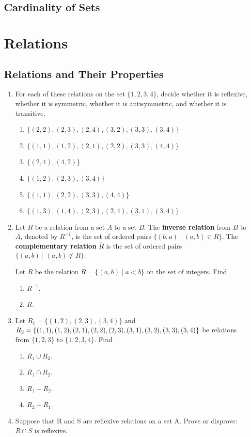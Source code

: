 \documentclass{sig-alternate-05-2015}
\begin{document}
\subsection{Cardinality of Sets}
\section{Relations}
\subsection{Relations and Their Properties}
\begin{enumerate}
\item For each of these relations on the set $\{1, 2, 3, 4\}$, decide
whether it is reflexive, whether it is symmetric, whether
it is antisymmetric, and whether it is transitive.
\begin{enumerate}
\item $\{(2, 2), (2, 3), (2, 4), (3, 2), (3, 3), (3, 4)\}$
\item $\{(1, 1), (1, 2), (2, 1), (2, 2), (3, 3), (4, 4)\}$
\item $\{(2, 4), (4, 2)\}$
\item $\{(1, 2), (2, 3), (3, 4)\}$
\item $\{(1, 1), (2, 2), (3, 3), (4, 4)\}$
\item $\{(1, 3), (1, 4), (2, 3), (2, 4), (3, 1), (3, 4)\}$
\end{enumerate}
\item 
Let $R$ be a relation from a set $A$ to a set $B$. The \textbf{inverse relation}
from $B$ to $A$, denoted by $R^{-1}$, is the set of ordered pairs
$\{(b, a) \mid (a, b) \in R\}$. The \textbf{complementary relation} $\overline{R}$ is the
set of ordered pairs $\{(a, b) \mid (a, b) \notin R\}$.

Let $R$ be the relation $R = \{(a, b) \mid a < b\}$ on the set of
integers. Find
\begin{enumerate}
	\item $R^{-1}$.
	\item $\overline{R}$.
\end{enumerate}
\item Let $R_1 = \{(1, 2), (2, 3), (3, 4)\}$ and $R_2 = \{(1, 1), (1, 2),\\
(2, 1), (2, 2), (2, 3), (3, 1), (3, 2), (3, 3), (3, 4)\}$ be relations
from $\{1, 2, 3\}$ to $\{1, 2, 3, 4\}$. Find
\begin{enumerate}
\item $R_1\cup R_2$. 
\item $R_1 \cap R_2$.
\item $R_1-R_2$. 
\item $R_2-R_1$.
\end{enumerate}
\item Suppose that R and S are reflexive relations on a set A.
Prove or disprove: $R \cap S$ is reflexive.


\end{enumerate}
\end{document}

